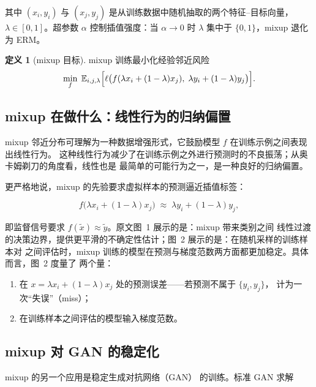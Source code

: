 \documentclass[11pt,a4paper]{article}
\theoremstyle{definition}
\newtheorem{definition}{定义}[section]
\begin{document}
其中 $(x_i,y_i)$ 与 $(x_j,y_j)$ 是从训练数据中随机抽取的两个特征--目标向量，
$\lambda\in[0,1]$。超参数 $\alpha$ 控制插值强度：当 $\alpha\to 0$ 时 $\lambda$ 集中于
$\{0,1\}$，mixup 退化为 ERM。

\begin{definition}[mixup 目标]
mixup 训练最小化经验邻近风险
\begin{equation}
  \min_{f}\;\mathbb{E}_{i,j,\lambda}\Bigl[
    \ell\bigl(f(\lambda x_i+(1-\lambda)x_j),\;\lambda y_i+(1-\lambda)y_j\bigr)
  \Bigr].
  \label{eq:mixup-objective}
\end{equation}
\end{definition}

\subsection{mixup 在做什么：线性行为的归纳偏置}

mixup 邻近分布可理解为一种数据增强形式，它鼓励模型 $f$ 在训练示例之间表现出线性行为。
这种线性行为减少了在训练示例之外进行预测时的不良振荡；从奥卡姆剃刀的角度看，线性也是
最简单的可能行为之一，是一种良好的归纳偏置。

更严格地说，mixup 的先验要求虚拟样本的预测逼近插值标签：

\begin{equation}
  f\bigl(\lambda x_i+(1-\lambda)x_j\bigr)\;\approx\;\lambda y_i+(1-\lambda)y_j,
  \label{eq:mixup-prior}
\end{equation}

即监督信号要求 $f(\tilde{x})\approx\tilde{y}$。原文图~1 展示的是：mixup 带来类别之间
线性过渡的决策边界，提供更平滑的不确定性估计；图~2 展示的是：在随机采样的训练样本对
之间评估时，mixup 训练的模型在预测与梯度范数两方面都更加稳定。具体而言，图~2 度量了
两个量：

\begin{enumerate}[itemsep=1pt]
  \item 在 $x=\lambda x_i+(1-\lambda)x_j$ 处的预测误差——若预测不属于 $\{y_i,y_j\}$，
        计为一次“失误”（miss）；
  \item 在训练样本之间评估的模型输入梯度范数。
\end{enumerate}

\subsection{mixup 对 GAN 的稳定化}

mixup 的另一个应用是稳定生成对抗网络（GAN）\cite{goodfellow2014gan} 的训练。标准 GAN
求解
\end{document}

